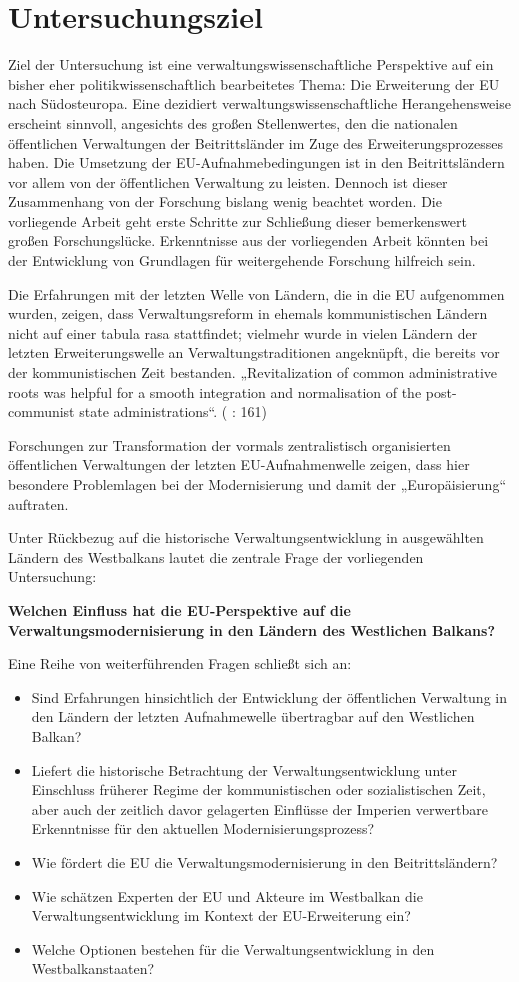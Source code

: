 \section{Untersuchungsziel}
Ziel der Untersuchung ist eine verwaltungswissenschaftliche Perspektive auf ein bisher eher politikwissenschaftlich bearbeitetes Thema: Die Erweiterung der EU nach Südosteuropa. Eine dezidiert verwaltungswissenschaftliche Herangehensweise erscheint sinnvoll, angesichts des großen Stellenwertes, den die nationalen öffentlichen Verwaltungen der Beitrittsländer im Zuge des Erweiterungsprozesses haben. Die Umsetzung der EU-Aufnahmebedingungen ist in den Beitrittsländern vor allem von der öffentlichen Verwaltung zu leisten. Dennoch ist dieser Zusammenhang von der Forschung bislang wenig beachtet worden. Die vorliegende Arbeit geht erste Schritte zur Schließung dieser bemerkenswert großen Forschungslücke. Erkenntnisse aus der vorliegenden Arbeit könnten bei der Entwicklung von Grundlagen für weitergehende Forschung hilfreich sein.\par
Die Erfahrungen mit der letzten Welle von Ländern, die in die EU aufgenommen wurden, zeigen, dass Verwaltungsreform in ehemals kommunistischen Ländern nicht auf einer tabula rasa stattfindet; vielmehr wurde in vielen Ländern der letzten Erweiterungswelle an Verwaltungstraditionen angeknüpft, die bereits vor der kommunistischen Zeit bestanden. „Revitalization of common administrative roots was helpful for a smooth integration and normalisation of the post-communist state administrations“. (\cite{lipumb05} : 161) \par
Forschungen zur Transformation der vormals zentralistisch organisierten öffentlichen Verwaltungen der letzten EU-Aufnahmenwelle zeigen, dass hier besondere Problemlagen bei der Modernisierung und damit der „Europäisierung“ auftraten.\par
Unter Rückbezug auf die historische Verwaltungsentwicklung in ausgewählten Ländern des Westbalkans lautet die zentrale Frage der vorliegenden Untersuchung:\par
{\bf Welchen Einfluss hat die EU-Perspektive auf die Verwaltungsmodernisierung in den Ländern des Westlichen Balkans?}

Eine Reihe von weiterführenden Fragen schließt sich an:
\begin{itemize}
\item Sind Erfahrungen hinsichtlich der Entwicklung der öffentlichen Verwaltung in den Ländern der letzten Aufnahmewelle übertragbar auf den Westlichen Balkan?
\item  Liefert die historische Betrachtung der Verwaltungsentwicklung unter Einschluss früherer Regime der kommunistischen oder sozialistischen Zeit, aber auch der zeitlich davor gelagerten Einflüsse der Imperien verwertbare Erkenntnisse für den aktuellen Modernisierungsprozess?
\item Wie fördert die EU die Verwaltungsmodernisierung in den Beitrittsländern?
\item Wie schätzen Experten der EU und Akteure im Westbalkan die Verwaltungsentwicklung im Kontext der EU-Erweiterung ein?
\item Welche Optionen bestehen für die Verwaltungsentwicklung in den Westbalkanstaaten?
\end{itemize}
